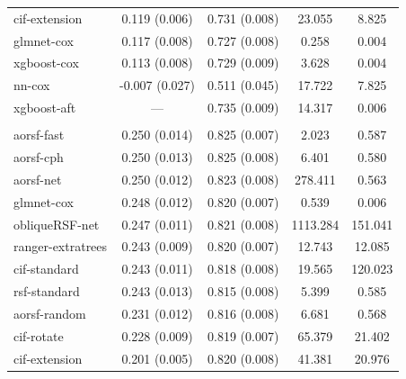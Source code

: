 \documentclass{article}\usepackage[]{graphicx}\usepackage[]{xcolor}
\newenvironment{knitrout}{}{} %
\begin{document}
\begin{knitrout}
\begin{longtable}[t]{lcccc}
\hspace{1em}cif-extension & 0.119 (0.006) & 0.731 (0.008) & 23.055 & 8.825\\
\hspace{1em}glmnet-cox & 0.117 (0.008) & 0.727 (0.008) & 0.258 & 0.004\\
\hspace{1em}xgboost-cox & 0.113 (0.008) & 0.729 (0.009) & 3.628 & 0.004\\
\hspace{1em}nn-cox & -0.007 (0.027) & 0.511 (0.045) & 17.722 & 7.825\\
\hspace{1em}xgboost-aft & --- & 0.735 (0.009) & 14.317 & 0.006\\
\addlinespace[0.3em]
\multicolumn{5}{l}{\textit{\textbf{Serum free light chain; death, n = 7874, p = 10}}}\\
\hline
\hspace{1em}aorsf-fast & 0.250 (0.014) & 0.825 (0.007) & 2.023 & 0.587\\
\hspace{1em}aorsf-cph & 0.250 (0.013) & 0.825 (0.008) & 6.401 & 0.580\\
\hspace{1em}aorsf-net & 0.250 (0.012) & 0.823 (0.008) & 278.411 & 0.563\\
\hspace{1em}glmnet-cox & 0.248 (0.012) & 0.820 (0.007) & 0.539 & 0.006\\
\hspace{1em}obliqueRSF-net & 0.247 (0.011) & 0.821 (0.008) & 1113.284 & 151.041\\
\hspace{1em}ranger-extratrees & 0.243 (0.009) & 0.820 (0.007) & 12.743 & 12.085\\
\hspace{1em}cif-standard & 0.243 (0.011) & 0.818 (0.008) & 19.565 & 120.023\\
\hspace{1em}rsf-standard & 0.243 (0.013) & 0.815 (0.008) & 5.399 & 0.585\\
\hspace{1em}aorsf-random & 0.231 (0.012) & 0.816 (0.008) & 6.681 & 0.568\\
\hspace{1em}cif-rotate & 0.228 (0.009) & 0.819 (0.007) & 65.379 & 21.402\\
\hspace{1em}cif-extension & 0.201 (0.005) & 0.820 (0.008) & 41.381 & 20.976\\

\end{longtable}
\end{knitrout}
\end{document}
